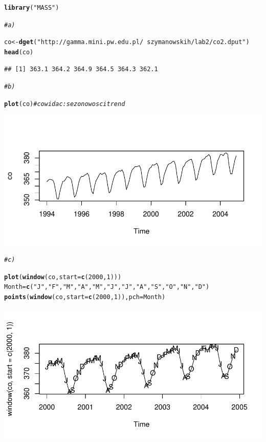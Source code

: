 \documentclass[10pt,a4paper,noindentfirst]{article}\usepackage[]{graphicx}\usepackage[]{color}
\makeatletter
\def\maxwidth{ %
  \ifdim\Gin@nat@width>\linewidth
    \linewidth
  \else
    \Gin@nat@width
  \fi
}
\newcommand{\hlnum}[1]{\textcolor[rgb]{0.686,0.059,0.569}{#1}}%
\newcommand{\hlstr}[1]{\textcolor[rgb]{0.192,0.494,0.8}{#1}}%
\newcommand{\hlcom}[1]{\textcolor[rgb]{0.678,0.584,0.686}{\textit{#1}}}%
\newcommand{\hlstd}[1]{\textcolor[rgb]{0.345,0.345,0.345}{#1}}%
\newcommand{\hlkwb}[1]{\textcolor[rgb]{0.69,0.353,0.396}{#1}}%
\newcommand{\hlkwc}[1]{\textcolor[rgb]{0.333,0.667,0.333}{#1}}%
\newcommand{\hlkwd}[1]{\textcolor[rgb]{0.737,0.353,0.396}{\textbf{#1}}}%
\newenvironment{kframe}{%
 \def\at@end@of@kframe{}%
 \ifinner\ifhmode%
  \def\at@end@of@kframe{\end{minipage}}%
  \begin{minipage}{\columnwidth}%
 \fi\fi%
 \def\FrameCommand##1{\hskip\@totalleftmargin \hskip-\fboxsep
 \colorbox{shadecolor}{##1}\hskip-\fboxsep
     \hskip-\linewidth \hskip-\@totalleftmargin \hskip\columnwidth}%
 \MakeFramed {\advance\hsize-\width
   \@totalleftmargin\z@ \linewidth\hsize
   \@setminipage}}%
 {\par\unskip\endMakeFramed%
 \at@end@of@kframe}
\newenvironment{knitrout}{}{} %
\makeatother
\begin{document}
\begin{knitrout}
\begin{kframe}
\begin{alltt}
\hlkwd{library}\hlstd{(}\hlstr{"MASS"}\hlstd{)}

\hlcom{# a)}

\hlstd{co} \hlkwb{<-} \hlkwd{dget}\hlstd{(}\hlstr{"http://gamma.mini.pw.edu.pl/~szymanowskih/lab2/co2.dput"}\hlstd{)}
\hlkwd{head}\hlstd{(co)}
\end{alltt}
\begin{verbatim}
## [1] 363.1 364.2 364.9 364.5 364.3 362.1
\end{verbatim}
\begin{alltt}
\hlcom{# b)}

\hlkwd{plot}\hlstd{(co)}  \hlcom{# co widac: sezonowosc i trend}
\end{alltt}
\end{kframe}

{\centering \includegraphics[width=\maxwidth]{figure/unnamed-chunk-12} 

}


\begin{kframe}\begin{alltt}
\hlcom{# c)}

\hlkwd{plot}\hlstd{(}\hlkwd{window}\hlstd{(co,}\hlkwc{start}\hlstd{=}\hlkwd{c}\hlstd{(}\hlnum{2000}\hlstd{,}\hlnum{1}\hlstd{)))}
\hlstd{Month}\hlkwb{=}\hlkwd{c}\hlstd{(}\hlstr{"J"}\hlstd{,} \hlstr{"F"}\hlstd{,}\hlstr{"M"}\hlstd{,}\hlstr{"A"}\hlstd{,}\hlstr{"M"}\hlstd{,}\hlstr{"J"}\hlstd{,}\hlstr{"J"}\hlstd{,}\hlstr{"A"}\hlstd{,}\hlstr{"S"}\hlstd{,}\hlstr{"O"}\hlstd{,}\hlstr{"N"}\hlstd{,}\hlstr{"D"} \hlstd{)}
\hlkwd{points}\hlstd{(}\hlkwd{window}\hlstd{(co,} \hlkwc{start}\hlstd{=}\hlkwd{c}\hlstd{(}\hlnum{2000}\hlstd{,}\hlnum{1}\hlstd{)),} \hlkwc{pch}\hlstd{=Month)}
\end{alltt}
\end{kframe}

{\centering \includegraphics[width=\maxwidth]{figure/unnamed-chunk-13} 

}
\end{knitrout}
\end{document}
